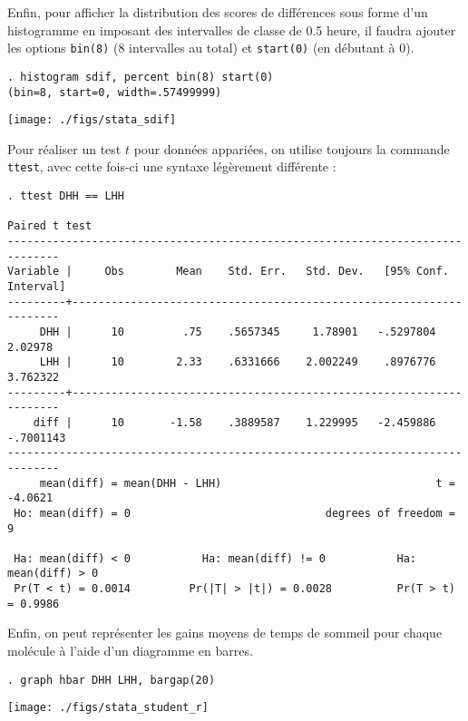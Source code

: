 Enfin, pour afficher la distribution des scores de différences sous forme
d'un histogramme en imposant des intervalles de classe de 0.5 heure, il
faudra ajouter les options \texttt{bin(8)} (8 intervalles au total) et
\texttt{start(0)} (en débutant à 0).
\begin{verbatim}
. histogram sdif, percent bin(8) start(0)
(bin=8, start=0, width=.57499999)
\end{verbatim}

\texttt{[image: ./figs/stata\_sdif]}

Pour réaliser un test $t$ pour données appariées, on utilise toujours la
commande \verb|ttest|, avec cette fois-ci une syntaxe légèrement
différente :
\begin{verbatim}
. ttest DHH == LHH

Paired t test
------------------------------------------------------------------------------
Variable |     Obs        Mean    Std. Err.   Std. Dev.   [95% Conf. Interval]
---------+--------------------------------------------------------------------
     DHH |      10         .75    .5657345     1.78901   -.5297804     2.02978
     LHH |      10        2.33    .6331666    2.002249    .8976776    3.762322
---------+--------------------------------------------------------------------
    diff |      10       -1.58    .3889587    1.229995   -2.459886   -.7001143
------------------------------------------------------------------------------
     mean(diff) = mean(DHH - LHH)                                 t =  -4.0621
 Ho: mean(diff) = 0                              degrees of freedom =        9

 Ha: mean(diff) < 0           Ha: mean(diff) != 0           Ha: mean(diff) > 0
 Pr(T < t) = 0.0014         Pr(|T| > |t|) = 0.0028          Pr(T > t) = 0.9986
\end{verbatim}

Enfin, on peut représenter les gains moyens de temps de sommeil pour
chaque molécule à l'aide d'un diagramme en barres.
\begin{verbatim}
. graph hbar DHH LHH, bargap(20)
\end{verbatim}

\texttt{[image: ./figs/stata\_student\_r]}

